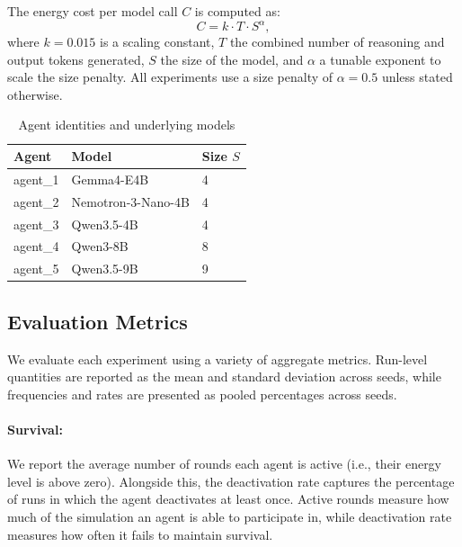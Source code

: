 \documentclass[sigconf,nonacm]{acmart}
\begin{document}
The energy cost per model call \(C\) is computed as:
\begin{equation*}
    C = k\cdot T\cdot S^{\alpha},
\end{equation*}
where \(k=0.015\) is a scaling constant, \(T\) the combined number of reasoning and output tokens generated, \(S\) the size of the model, and \(\alpha\) a tunable exponent to scale the size penalty.
All experiments use a size penalty of \(\alpha=0.5\) unless  stated otherwise.

\begin{table}[H]
\centering
\small
\begin{tabular}{lll}
\toprule
Agent & Model & Size \(S\) \\
\midrule
agent\_1 & Gemma4-E4B & 4 \\
agent\_2 & Nemotron-3-Nano-4B & 4 \\
agent\_3 & Qwen3.5-4B & 4 \\
agent\_4 & Qwen3-8B & 8 \\
agent\_5 & Qwen3.5-9B & 9 \\
\bottomrule
\end{tabular}
\caption{Agent identities and underlying models}
\label{tab:agent_models}
\end{table}

\subsection{Evaluation Metrics}
We evaluate each experiment using a variety of aggregate metrics. 
Run-level quantities are reported as the mean and standard deviation across seeds, while frequencies and rates are presented as pooled percentages across seeds.

\paragraph{\textbf{Survival}:}
We report the average number of rounds each agent is active (i.e., their energy level is above zero).
Alongside this, the deactivation rate captures the percentage of runs in which the agent deactivates at least once.
Active rounds measure how much of the simulation an agent is able to participate in, while deactivation rate measures how often it fails to maintain survival.
\end{document}
